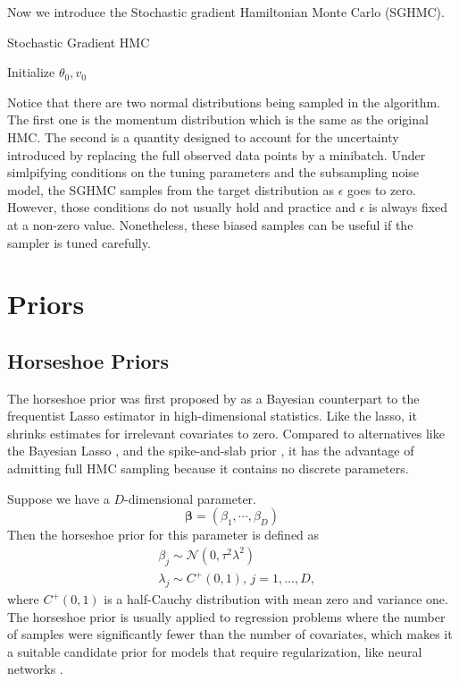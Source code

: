 \documentclass[12pt]{report}
\begin{document}
Now we introduce the Stochastic gradient Hamiltonian Monte Carlo (SGHMC). \cite{chen2014stochastic}


\begin{algorithm}
    \caption{Stochastic Gradient HMC}
        Initialize $\theta_0,v_0$ \;
\end{algorithm}

Notice that there are two normal distributions being sampled in the algorithm. The first one is the momentum distribution which is the same as the original HMC. The second is a quantity designed to account for the uncertainty introduced by replacing the full observed data points by a minibatch. Under simlpifying conditions on the tuning parameters and the subsampling noise model, the SGHMC samples from the target distribution as $\epsilon$ goes to zero. However, those conditions do not usually hold and practice and $\epsilon$ is always fixed at a non-zero value. Nonetheless, these biased samples can be useful if the sampler is tuned carefully.


\section{Priors}
\subsection{Horseshoe Priors}
The horseshoe prior was first proposed by \cite{carvalho2009handling} as a Bayesian counterpart to the frequentist Lasso estimator in high-dimensional statistics. Like the lasso, it shrinks estimates for irrelevant covariates to zero. Compared to alternatives like the Bayesian Lasso \cite{park2008bayesian}, and the spike-and-slab prior \cite{mitchell1988bayesian}, it has the advantage of admitting full HMC sampling because it contains no discrete parameters.

Suppose we have a $D$-dimensional parameter.
\[ \mathbf{\beta} = (\beta_1,\cdots,\beta_D)\]
Then the horseshoe prior for this parameter is defined as
\begin{align*}
 &\beta_j \sim \mathcal{N}(0,\tau^2\lambda^2) \\
 &\lambda_j \sim C^+(0,1),\, j = 1,\dots , D, 
\end{align*}
where $C^+(0,1)$ is a half-Cauchy distribution with mean zero and variance one. The horseshoe prior is usually applied to regression problems where the number of samples were significantly fewer than the number of covariates, which makes it a suitable candidate prior for models that require regularization, like neural networks \cite{ghosh2017model}.
\end{document}
